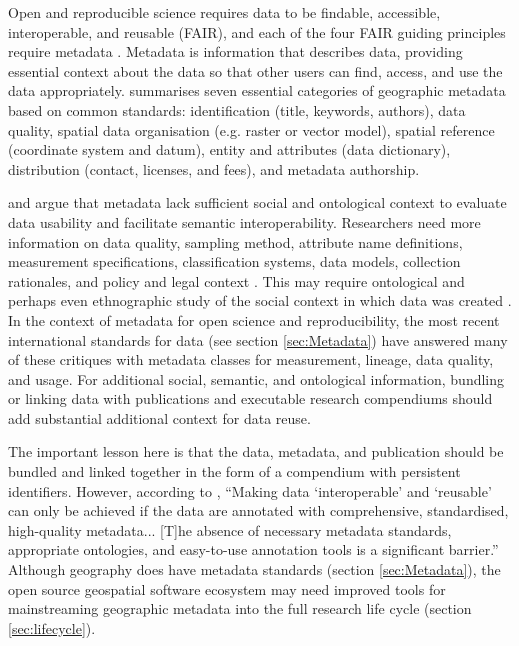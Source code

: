 \documentclass{isprs} %
\begin{document}
Open and reproducible science requires data to be findable, accessible, interoperable, and reusable (FAIR), and each of the four FAIR guiding principles require metadata \citep{Wilkinson2016, NASEM2018}.
Metadata is information that describes data, providing essential context about the data so that other users can find, access, and use the data appropriately.
\citet{Kim1999} summarises seven essential categories of geographic metadata based on common standards: identification (title, keywords, authors), data quality, spatial data organisation (e.g. raster or vector model), spatial reference (coordinate system and datum), entity and attributes (data dictionary), distribution (contact, licenses, and fees), and metadata authorship.

\citet{Schuurman2006} and \citet{Comber2008} argue that metadata lack sufficient social and ontological context to evaluate data usability and facilitate semantic interoperability.
Researchers need more information on data quality, sampling method, attribute name definitions, measurement specifications, classification systems, data models, collection rationales, and policy and legal context \citep{Schuurman2006}.
This may require ontological and perhaps even ethnographic study of the social context in which data was created \citep{Schuurman2008}.
In the context of metadata for open science and reproducibility, the most recent international standards for data (see section \ref{sec:Metadata}) have answered many of these critiques with metadata classes for measurement, lineage, data quality, and usage.
For additional social, semantic, and ontological information, bundling or linking data with publications and executable research compendiums should add substantial additional context for data reuse.

The important lesson here is that the data, metadata, and publication should be bundled and linked together in the form of a compendium with persistent identifiers.
However, according to \citet[137-8]{NASEM2018}, ``Making data `interoperable' and `reusable' can only be achieved if the data are annotated with comprehensive, standardised, high-quality metadata... [T]he absence of necessary metadata standards, appropriate ontologies, and easy-to-use annotation tools is a significant barrier.''
Although geography does have metadata standards (section \ref{sec:Metadata}), the open source geospatial software ecosystem may need improved tools for mainstreaming geographic metadata into the full research life cycle (section \ref{sec:lifecycle}).
\end{document}
